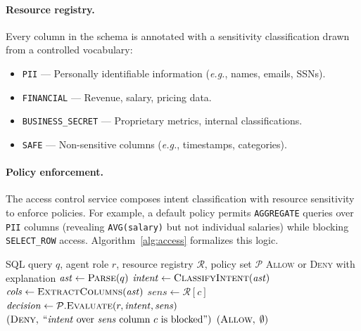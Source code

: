\documentclass[sigconf, nonacm]{acmart}
\newcommand{\eg}{\textit{e.g.}\xspace}
\begin{document}
\paragraph{Resource registry.}
Every column in the schema is annotated with a sensitivity classification
drawn from a controlled vocabulary:

\begin{itemize}[leftmargin=*]
  \item \texttt{PII} --- Personally identifiable information (\eg, names,
        emails, SSNs).
  \item \texttt{FINANCIAL} --- Revenue, salary, pricing data.
  \item \texttt{BUSINESS\_SECRET} --- Proprietary metrics, internal
        classifications.
  \item \texttt{SAFE} --- Non-sensitive columns (\eg, timestamps, categories).
\end{itemize}

\paragraph{Policy enforcement.}
The access control service composes intent classification with resource
sensitivity to enforce policies. For example, a default policy permits
\texttt{AGGREGATE} queries over \texttt{PII} columns (revealing
\texttt{AVG(salary)} but not individual salaries) while blocking
\texttt{SELECT\_ROW} access. Algorithm~\ref{alg:access} formalizes this logic.

\begin{algorithm}[t]
\caption{Intent-Based Access Control}
\label{alg:access}
\begin{algorithmic}[1]
\Require SQL query $q$, agent role $r$, resource registry $\mathcal{R}$, policy set $\mathcal{P}$
\Ensure \textsc{Allow} or \textsc{Deny} with explanation
\State $\mathit{ast} \gets \textsc{Parse}(q)$ 
\State $\mathit{intent} \gets \textsc{ClassifyIntent}(\mathit{ast})$
\State $\mathit{cols} \gets \textsc{ExtractColumns}(\mathit{ast})$
    \State $\mathit{sens} \gets \mathcal{R}[c]$
    \State $\mathit{decision} \gets \mathcal{P}.\textsc{Evaluate}(r, \mathit{intent}, \mathit{sens})$
        \State \Return $(\textsc{Deny},\;
               \text{``}\mathit{intent}\text{ over }\mathit{sens}\text{ column }c\text{ is blocked''})$
    \EndIf
\EndFor
\State \Return $(\textsc{Allow},\; \emptyset)$
\end{algorithmic}
\end{algorithm}
\end{document}
